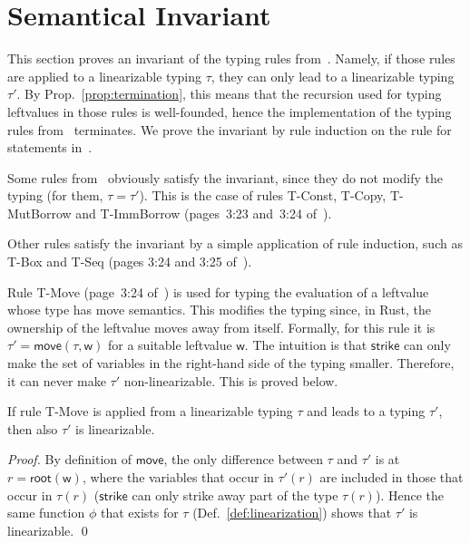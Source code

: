 \section{Semantical Invariant}\label{sec:invariant}

This section proves an invariant of the typing rules
from~\cite{Pearce21}. Namely,
if those rules are applied to a linearizable typing $\tau$,
they can only lead to a linearizable typing $\tau'$.
By Prop.~\ref{prop:termination}, this means that the recursion used for
typing leftvalues in those rules is well-founded,
hence the implementation of the typing rules from~\cite{Pearce21} terminates.
We prove the invariant by rule induction on the rule for statements in~\cite{Pearce21}.

Some rules from~\cite{Pearce21} obviously satisfy the invariant,
since they do not modify the typing (for them, $\tau=\tau'$).
This is the case of rules
\textsf{T-Const}, \textsf{T-Copy}, \textsf{T-MutBorrow} and
\textsf{T-ImmBorrow} (pages~3:23 and~3:24 of~\cite{Pearce21}).

Other rules satisfy the invariant by a simple application of
rule induction, such as \textsf{T-Box} and \textsf{T-Seq}
(pages 3:24 and 3:25 of~\cite{Pearce21}).

Rule \textsf{T-Move} (page~3:24 of~\cite{Pearce21})
is used for typing the evaluation of a leftvalue
whose type has move semantics. This modifies the typing since, in Rust,
the ownership of the leftvalue moves away from itself.
Formally, for this rule it is $\tau'=\mathsf{move}(\tau,\mathsf{w})$
for a suitable leftvalue $\mathsf{w}$.
The intuition is that
$\mathsf{strike}$ can only make the set of variables in the right-hand side
of the typing smaller. Therefore, it can never make $\tau'$
non-linearizable. This is proved below.

\begin{lemma}\label{lem:move_invariant}
  If rule \textsf{T-Move} is applied from a linearizable typing $\tau$
  and leads to a typing $\tau'$, then also $\tau'$ is linearizable.
\end{lemma}
\begin{proof}
  By definition of $\mathsf{move}$, the only
  difference between $\tau$ and $\tau'$ is at $r=\mathsf{root}(\mathsf{w})$,
  where the variables that occur in $\tau'(r)$ are included in those that occur
  in $\tau(r)$ ($\mathsf{strike}$ can only strike away part of the type $\tau(r)$).
  Hence the same function $\phi$ that exists for $\tau$ (Def.~\ref{def:linearization})
  shows that $\tau'$ is linearizable.
  \qed
\end{proof}

